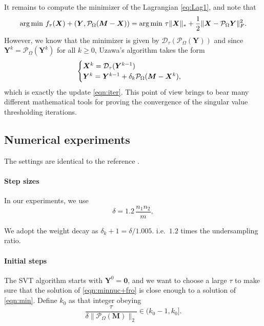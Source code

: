 \documentclass[conference,onecolumn,12pt]{IEEEtran}
\newcommand{\mtx}[1]{\bm{#1}}
\numberwithin{equation}{section}
\numberwithin{figure}{section}
\numberwithin{table}{section}
\theoremstyle{definition}
\begin{document}
It remains to compute the minimizer of the Lagrangian \eqref{eq:Lag1},
and note that
\begin{equation}\label{eqn:argminequiv}
\arg \min \, f_\tau(\mtx{X}) + (\mtx{Y}, {\cal P}_\Omega(\mtx{M} -
\mtx{X})) = \arg \min \, \tau \|\mtx{X}\|_* + \frac{1}{2} \|\mtx{X} -
\mathcal{P}_\Omega \mtx{Y}\|^2_F.
\end{equation}
However, we know that the minimizer is given by
$\mathcal{D}_\tau(\mathcal{P}_\Omega(\mtx{Y}))$ and since $\mtx{Y}^{k}
= \mathcal{P}_\Omega(\mtx{Y}^k)$ for all $k \ge 0$, Uzawa's algorithm
takes the form
\begin{align*}
\begin{cases}
  \mtx{X}^k   = {\cal D}_{\tau} (\mtx{Y}^{k-1})\cr
  \mtx{Y}^k  = \mtx{Y}^{k-1} + \delta_k \mathcal{P}_\Omega(\mtx{M} - \mtx{X}^k),
\end{cases}
\end{align*}
which is exactly the update \eqref{eqn:iter}. This point of view
brings to bear many different mathematical tools for proving the
convergence of the singular value thresholding iterations.
\subsection{Numerical experiments}
The settings are identical to the reference \cite{mazumder2010spectral}.
\paragraph{Step sizes}
In our experiments, we use
\begin{equation}
  \label{eq:heuristic}
  \delta  = 1.2 \, \frac{n_1 n_2}{m},
\end{equation}

We adopt the weight decay as $\delta_k+1 = \delta/1.005$.
i.e.~$1.2$ times the undersampling ratio. 

\paragraph{Initial steps}

The SVT algorithm starts with $\mtx{Y}^0=\mtx{0}$, and we want to
choose a large $\tau$ to make sure that the solution of
\eqref{eqn:minnuc+fro} is close enough to a solution of
\eqref{eqn:min}. Define $k_0$ as that integer obeying
\begin{equation}\label{eqn:k0}
\frac{\tau}{\delta\|\mathcal{P}_{\Omega}(\mtx{M})\|_2} \in (k_0-1,
k_0].
\end{equation}
\end{document}
